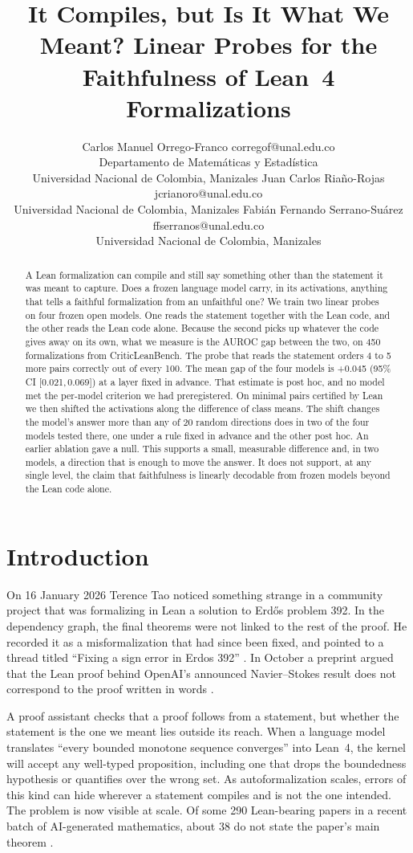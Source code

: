 \documentclass[10pt]{article}
\title{It Compiles, but Is It What We Meant? Linear Probes for the Faithfulness of Lean~4 Formalizations}
\author{\name Carlos Manuel Orrego-Franco \email corregof@unal.edu.co \\
      \addr Departamento de Matem\'aticas y Estad\'istica\\
      Universidad Nacional de Colombia, Manizales
      \AND
      \name Juan Carlos Ria\~no-Rojas \email jcrianoro@unal.edu.co \\
      \addr Universidad Nacional de Colombia, Manizales
      \AND
      \name Fabi\'an Fernando Serrano-Su\'arez \email ffserranos@unal.edu.co \\
      \addr Universidad Nacional de Colombia, Manizales}
\newcommand{\ic}[2]{[#1,\,#2]}
\begin{document}
\maketitle

\begin{abstract}
A Lean formalization can compile and still say something other than the statement it was meant to capture. Does a
frozen language model carry, in its activations, anything that tells a faithful formalization from an unfaithful one?
We train two linear probes on four frozen open models. One reads the statement together with the Lean code, and the
other reads the Lean code alone. Because the second picks up whatever the code gives away on its own, what we measure
is the AUROC gap between the two, on 450 formalizations from CriticLeanBench. The probe that reads the statement
orders 4 to 5 more pairs correctly out of every 100. The mean gap of the four models is +0.045 (95\% CI
\ic{0.021}{0.069}) at a layer fixed in advance. That estimate is post hoc, and no model met the per-model criterion
we had preregistered. On minimal pairs certified by Lean we then shifted the activations along the difference of
class means. The shift changes the model's answer more than any of 20 random directions does in two of the four
models tested there, one under a rule fixed in advance and the other post hoc. An earlier ablation gave a null. This
supports a small, measurable difference and, in two models, a direction that is enough to move the answer. It does
not support, at any single level, the claim that faithfulness is linearly decodable from frozen models beyond the
Lean code alone.
\end{abstract}

\section{Introduction}

On 16 January 2026 Terence Tao noticed something strange in a community project that was formalizing in Lean a
solution to Erd\H{o}s problem 392. In the dependency graph, the final theorems were not linked to the rest of the
proof. He recorded it as a misformalization that had since been fixed, and pointed to a thread titled ``Fixing a
sign error in Erdos 392'' \citep{tao2026log}. In October a preprint argued that the Lean proof behind OpenAI's announced Navier--Stokes result
does not correspond to the proof written in words \citep{bastounis2026lost}.

A proof assistant checks that a proof follows from a statement, but whether the statement is the one we meant lies
outside its reach. When a language model translates ``every bounded monotone sequence converges'' into Lean~4, the
kernel will accept any well-typed proposition, including one that drops the boundedness hypothesis or quantifies
over the wrong set. As autoformalization scales, errors of this kind can hide wherever a statement compiles and is
not the one intended.
The problem is now visible at scale. Of some 290 Lean-bearing papers in a recent batch of AI-generated mathematics, about
38 do not state the paper's main theorem \citep{xena2026checked}.
\end{document}
